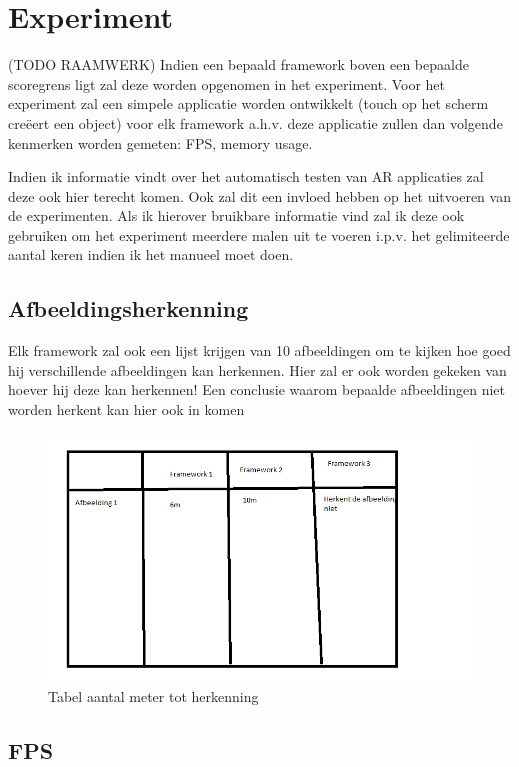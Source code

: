 \chapter{Experiment}
\label{ch:experiment}

(TODO RAAMWERK) Indien een bepaald framework boven een bepaalde scoregrens ligt zal deze worden opgenomen in het experiment.
Voor het experiment zal een simpele applicatie worden ontwikkelt (touch op het scherm creëert een object) voor elk framework a.h.v. deze applicatie zullen dan volgende kenmerken worden gemeten:  FPS, memory usage.

Indien ik informatie vindt over het automatisch testen van AR applicaties zal deze ook hier terecht komen. Ook zal dit een invloed hebben op het uitvoeren van de experimenten. Als ik hierover bruikbare informatie vind zal ik deze ook gebruiken om het experiment meerdere malen uit te voeren i.p.v. het gelimiteerde aantal keren indien ik het manueel moet doen.

\section{Afbeeldingsherkenning}
Elk framework zal ook een lijst krijgen van 10 afbeeldingen om te kijken hoe goed hij verschillende afbeeldingen kan herkennen. Hier zal er ook worden gekeken van hoever hij deze kan herkennen!
Een conclusie waarom bepaalde afbeeldingen niet worden herkent kan hier ook in komen
\begin{figure}
    \includegraphics[width=\textwidth]{img/imgrex}\caption{Tabel aantal meter tot herkenning}\label{fig:imgrex}
\end{figure}

\section{FPS}\label{sec:fps}

